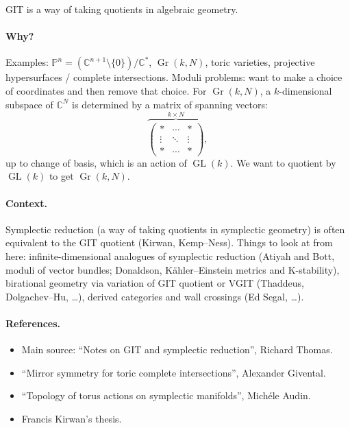 \documentclass{article}
\theoremstyle{definition}
\DeclareMathOperator{\Gr}{Gr}
\DeclareMathOperator{\GL}{GL}
\renewcommand{\P}{\mathbb{P}}
\newcommand{\C}{\mathbb{C}}
\begin{document}
GIT is a way of taking quotients in algebraic geometry.

\paragraph{Why?} Examples: $\P^n=(\C^{n+1}\setminus\{0\})/\C^*$, $\Gr(k,N)$,
toric varieties, projective hypersurfaces / complete intersections. Moduli
problems: want to make a choice of coordinates and then remove that choice. For
$\Gr(k,N)$, a $k$-dimensional subspace of $\C^N$ is determined by a matrix of
spanning vectors:
\begin{equation*}
    \overbrace{\begin{pmatrix}
        * & \cdots & * \\
        \vdots & \ddots & \vdots \\
        * & \cdots & *
    \end{pmatrix}}^{k\times N},
\end{equation*}
up to change of basis, which is an action of $\GL(k)$. We want to quotient by
$\GL(k)$ to get $\Gr(k,N)$.

\paragraph{Context.} Symplectic reduction (a way of taking quotients in
symplectic geometry) is often equivalent to the GIT quotient (Kirwan,
Kemp--Ness). Things to look at from here: infinite-dimensional analogues of
symplectic reduction (Atiyah and Bott, moduli of vector bundles; Donaldson,
K\"ahler--Einstein metrics and K-stability), birational geometry via variation
of GIT quotient or VGIT (Thaddeus, Dolgachev--Hu, \ldots), derived categories
and wall crossings (Ed Segal, \ldots).

\paragraph{References.}
\begin{itemize}
    \item Main source: ``Notes on GIT and symplectic reduction'',
        Richard Thomas.
    \item ``Mirror symmetry for toric complete intersections'',
        Alexander Givental.
    \item ``Topology of torus actions on symplectic manifolds'',
        Mich\'ele Audin.
    \item Francis Kirwan's thesis.
\end{itemize}
\end{document}
